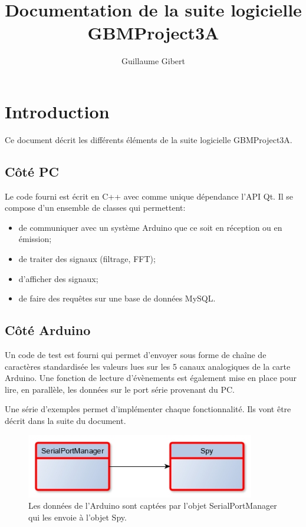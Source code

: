 \documentclass{article}
\begin{document}
\title{Documentation de la suite logicielle GBMProject3A}
\author{Guillaume Gibert}
\maketitle

\section{Introduction}
Ce document décrit les différents éléments de la suite logicielle GBMProject3A.

\subsection{Côté PC}
Le code fourni est écrit en C++ avec comme unique dépendance l'API Qt.
Il se compose d'un ensemble de classes qui permettent:
\begin{itemize}
\item de communiquer avec un système Arduino que ce soit en réception ou en émission;
\item de traiter des signaux (filtrage, FFT);
\item d'afficher des signaux;
\item de faire des requêtes sur une base de données MySQL.
\end{itemize}

\subsection{Côté Arduino}
Un code de test est fourni qui permet d'envoyer sous forme de chaîne de caractères standardisée les valeurs lues sur les 5 canaux analogiques de la carte Arduino. Une fonction de lecture d'évènements est également mise en place pour lire, en parallèle, les données sur le port série provenant du PC.


Une série d'exemples permet d'implémenter chaque fonctionnalité. Ils vont être décrit dans la suite du document.

\begin{figure}
 \centering
    \includegraphics[width=10cm]{images/GBMProject3A_ex1.jpg}
    \caption{Les données de l'Arduino sont captées par l'objet SerialPortManager qui les envoie à l'objet Spy.}
    \label{ex1}
\end{figure}
\end{document}
